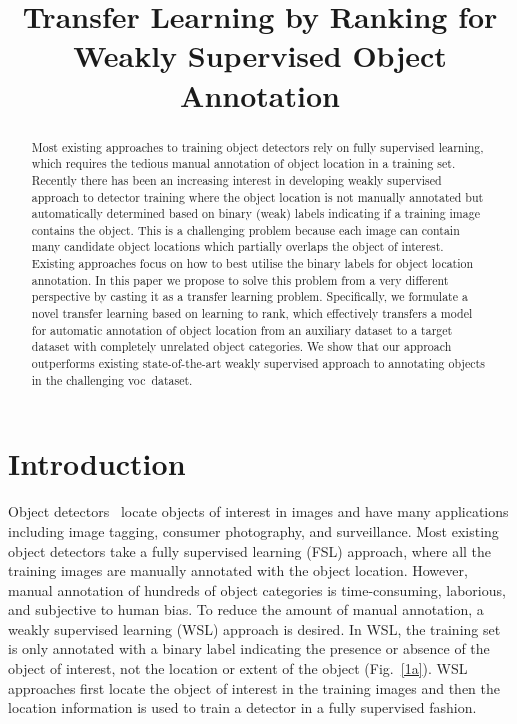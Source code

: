 \documentclass{bmvc2k}
\title{Transfer Learning by Ranking for Weakly Supervised Object Annotation}
\def\voc{{\sc voc}}
\begin{document}
\maketitle

\begin{abstract}
Most existing approaches to training object detectors rely on fully supervised learning, which requires the tedious manual annotation of object location in a training set. Recently there has been an increasing interest in developing weakly supervised approach to detector training where the object location is not manually annotated but automatically determined based on binary (weak) labels indicating if a training image contains the object. This is a challenging problem because each image can contain many candidate object locations which partially overlaps the object of interest. Existing approaches focus on how to best utilise the binary labels for object location annotation. In this paper we propose to solve this problem from a very different perspective by casting it as a transfer learning problem. Specifically, we formulate a novel  transfer learning based on learning to rank, which effectively transfers a model for automatic annotation of object location from an auxiliary dataset to a target dataset with completely unrelated object categories. We show that our approach outperforms existing state-of-the-art weakly supervised approach to annotating objects in the challenging \voc~dataset.
\end{abstract}


\section{Introduction}
\label{sec:intro}
Object detectors~\cite{Viola2001rapid,Felzenszwalb2012partbased} locate objects of interest in images and have many applications including image tagging, consumer photography, and surveillance. Most existing object detectors take a fully supervised learning (FSL) approach, where all the training images are manually annotated with the object location. However, manual annotation of hundreds of object categories is time-consuming, laborious, and subjective to human bias. To reduce the amount of manual annotation, a weakly supervised learning (WSL) \cite{Deselaerslocalizing2010, Sivaiccv2011, Nguyenweakly2011, Pandeyiccv2011} approach is desired. In WSL, the training set is only annotated with a binary label indicating the presence or absence of the object of interest, not the location or extent of the object (Fig.~\ref{1a}). WSL approaches first locate the object of interest in the training images and then the location information is used to train a detector in a fully supervised fashion.
\end{document}
